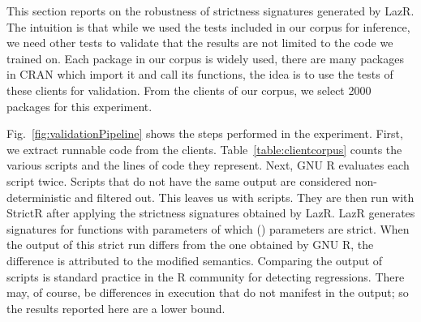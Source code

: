 \documentclass[review,screen,acmsmall]{acmart}
\newcommand{\strictr}{{\sf StrictR}\xspace}
\newcommand{\lazr}{{\sf LazR}\xspace}
\begin{document}
This section reports on the robustness of strictness signatures generated by
\lazr. The intuition is that while we used the tests included in our corpus for
inference, we need other tests to validate that the results are not limited to
the code we trained on. Each package in our corpus is widely used, there are
many packages in CRAN which import it and call its functions, the idea is to use
the tests of these clients for validation. From the \CorpusDependencyCount
clients of our corpus, we select 2000 packages for this experiment.

Fig.~\ref{fig:validationPipeline} shows the steps performed in the experiment.
First, we extract runnable code from the clients. Table~\ref{table:clientcorpus}
counts the various scripts and the lines of code they represent. Next, GNU R
evaluates each script twice. Scripts that do not have the same output are
considered non-deterministic and filtered out. This leaves us with
\ValidationBaselineProgramCount scripts. They are then run with \strictr after
applying the strictness signatures obtained by \lazr. \lazr generates signatures
for \TotalFunctionCount functions with \TotalParameterCount parameters of which
\TotalStrictParamCount (\TotalStrictParamPerc) parameters are strict. When the
output of this strict run differs from the one obtained by GNU R, the difference
is attributed to the modified semantics. Comparing the output of scripts is
standard practice in the R community for detecting regressions. There may, of
course, be differences in execution that do not manifest in the output; so the
results reported here are a lower bound.
\end{document}
